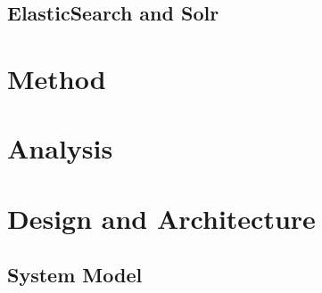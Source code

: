 \documentclass[12pt,a4paper,twoside,openright]{book}
\begin{document}
\section{ElasticSearch and Solr}

\chapter{Method}
\label{chap:method}


\chapter{Analysis}
\label{chap:analysis}




\chapter{Design and Architecture}
\label{sec:design}

\section{System Model}
\end{document}
